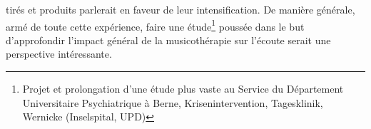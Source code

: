 tirés et
produits parlerait en faveur de leur intensification.
De manière générale, armé de toute cette expérience, faire une étude\footnote{ Projet et
	prolongation d'une étude plus vaste au Service du
	Département Universitaire Psychiatrique à Berne, Krisenintervention,
	Tagesklinik, Wernicke (Inselspital, UPD) } poussée dans le but d'approfondir l'impact général de la
musicothérapie sur l'écoute serait une perspective intéressante.



















